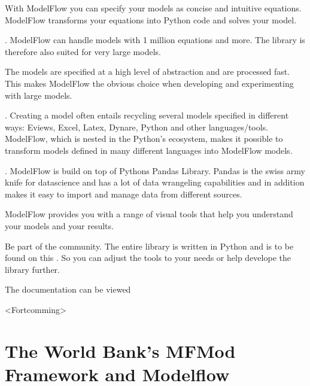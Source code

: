 \documentclass[letterpaper,10pt,english]{jupyterBook}
\begin{document}
\sphinxAtStartPar
{} With ModelFlow you can specify your models as concise and intuitive equations. ModelFlow transforms your equations into Python code and solves your model.

\sphinxAtStartPar
{}.
ModelFlow can handle models with 1 million equations and more. The library is therefore also suited for very large models.

\sphinxAtStartPar
{}
The models are specified at a high level of abstraction and are processed fast. This makes ModelFlow the obvious choice when developing and experimenting with large models.

\sphinxAtStartPar
{}.
Creating a model often entails recycling several models specified in different ways: Eviews, Excel, Latex, Dynare, Python and other languages/tools.
ModelFlow, which is nested in the Python’s ecosystem, makes it possible to transform models defined in many different languages into ModelFlow models.

\sphinxAtStartPar
{}.
ModelFlow is build on top of Pythons Pandas Library. Pandas is the swiss army knife for datascience and has a lot of data wrangeling capabilities and in addition makes it easy to import and manage data from different sources.

\sphinxAtStartPar
{} ModelFlow provides you with a range of visual tools that help you understand your models and your results.

\sphinxAtStartPar
{}
Be part of the community. The entire library is written in Python and is to be found on this   . So you can adjust the tools to your needs or help develope the library further.

\sphinxAtStartPar
The documentation can be viewed 

\sphinxAtStartPar
{}
<Fortcomming>

\sphinxstepscope


\part{The World Bank's MFMod Framework and Modelflow}

\sphinxstepscope
\end{document}
